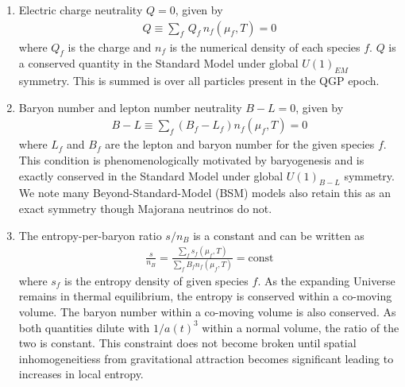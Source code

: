 \documentclass[universe,article,submit,moreauthors,pdftex,a4paper]{Definitions/mdpi}
\begin{document}
\begin{enumerate}
\item Electric charge neutrality $Q=0$, given by
\begin{align}\label{QGP_Q}
    Q\equiv\sum_f\,Q_f\,n_f(\mu_f,T)=0
\end{align}
where $Q_f$ is the charge and $n_{f}$ is the numerical density of each species $f$. $Q$ is a conserved quantity in the Standard Model under global $U(1)_{EM}$ symmetry. This is summed is over all particles present in the QGP epoch.
\item Baryon number and lepton number neutrality $B-L=0$, given by
\begin{align}\label{QGP_LB}
B-L\equiv\sum_f(B_f-L_f)n_f(\mu_f,T)=0
\end{align}
where $L_f$ and $B_f$ are the lepton and baryon number for the given species $f$. This condition is phenomenologically motivated by baryogenesis and is exactly conserved in the Standard Model under global $U(1)_{B-L}$ symmetry. We note many Beyond-Standard-Model (BSM) models also retain this as an exact symmetry though Majorana neutrinos do not.
\item The entropy-per-baryon ratio $s/n_B$ is a constant and can be written as
\begin{align}\label{QGP_sB}
\frac{s}{n_B}=\frac{\sum_fs_f(\mu_f,T)}{\sum_fB_fn_f(\mu_f,T)}=\mathrm{const}
\end{align}
where $s_f$ is the entropy density of given species $f$. As the expanding Universe remains in thermal equilibrium, the entropy is conserved within a co-moving volume. The baryon number within a co-moving volume is also conserved. As both quantities dilute with $1/a(t)^{3}$ within a normal volume, the ratio of the two is constant. This constraint does not become broken until spatial inhomogeneitiess from gravitational attraction becomes significant leading to increases in local entropy.
\end{enumerate}
\end{document}
